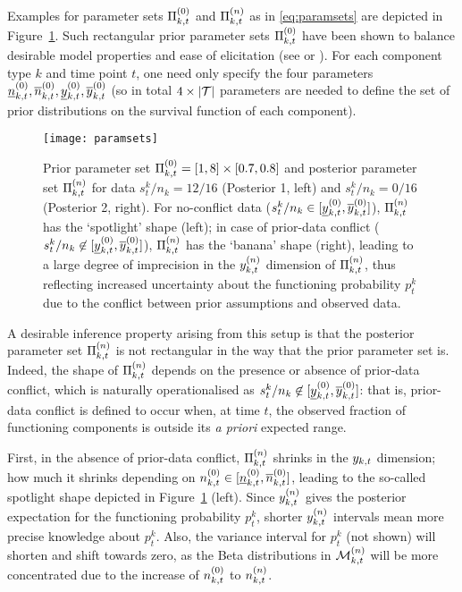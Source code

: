 \documentclass[12pt, a4paper]{elsarticle}
\begin{document}
Examples for parameter sets $\Pi^{(0)}_{k,t}$ and $\Pi^{(n)}_{k,t}$ as in \eqref{eq:paramsets} are depicted in Figure~\ref{fig:paramsets}.
Such rectangular prior parameter sets $\Pi^{(0)}_{k,t}$ have been shown
to balance desirable model properties and ease of elicitation 
(see \citet[pp.~123f]{2013:diss-gw} or \citet{Troffaes2013a-short}).
%
For each component type $k$ and time point $t$,
one need only specify the four parameters $\underline{n}^{(0)}_{k,t}, \overline{n}^{(0)}_{k,t}, \underline{y}^{(0)}_{k,t}, \overline{y}^{(0)}_{k,t}$
(so in total $4 \times |{\cal T}|$ parameters are needed to define the set of prior distributions
on the survival function of each component).

\begin{figure}
\texttt{[image: paramsets]}
\caption{Prior parameter set $\Pi^{(0)}_{k,t} = [1,8] \times [0.7,0.8]$ and posterior parameter set $\Pi^{(n)}_{k,t}$
for data $s^k_t/n_k = 12/16$ (Posterior 1, left) and $s^k_t/n_k = 0/16$ (Posterior 2, right).
For no-conflict data ($s^k_t/n_k \in [\underline{y}^{(0)}_{k,t},\overline{y}^{(0)}_{k,t}]$), $\Pi^{(n)}_{k,t}$ has the `spotlight' shape (left);
in case of prior-data conflict ($s^k_t/n_k \not\in [\underline{y}^{(0)}_{k,t},\overline{y}^{(0)}_{k,t}]$), $\Pi^{(n)}_{k,t}$ has the `banana' shape (right),
leading to a large degree of imprecision in the $y^{(n)}_{k,t}$ dimension of $\Pi^{(n)}_{k,t}$,
thus reflecting increased uncertainty about the functioning probability $p^k_t$
due to the conflict between prior assumptions and observed data.}
\label{fig:paramsets}
\end{figure}

A desirable inference property arising from this setup is that
the posterior parameter set $\Pi^{(n)}_{k,t}$ is not rectangular in the way that the prior parameter set is.
Indeed, the shape of $\Pi^{(n)}_{k,t}$ depends on the presence or absence of prior-data conflict,
which is naturally operationalised as $s^k_t/n_k \not\in [\underline{y}^{(0)}_{k,t}, \overline{y}^{(0)}_{k,t}]$:
that is, prior-data conflict is defined to occur when, at time $t$, the observed fraction of functioning components
is outside its \emph{a priori} expected range.

First, in the absence of prior-data conflict, 
$\Pi^{(n)}_{k,t}$ shrinks in the $y_{k,t}$ dimension;
how much it shrinks depending on $n^{(0)}_{k,t} \in [\underline{n}^{(0)}_{k,t}, \overline{n}^{(0)}_{k,t}]$,
leading to the so-called spotlight shape depicted in Figure~\ref{fig:paramsets} (left).
Since $y^{(n)}_{k,t}$ gives the posterior expectation for the functioning probability $p_t^k$,
shorter $y^{(n)}_{k,t}$ intervals mean more precise knowledge about $p_t^k$.
Also, the variance interval for $p_t^k$ (not shown) will shorten and shift towards zero,
as the Beta distributions in $\mathcal{M}^{(n)}_{k,t}$ will be more concentrated
due to the increase of $n^{(0)}_{k,t}$ to $n^{(n)}_{k,t}$.
\end{document}
